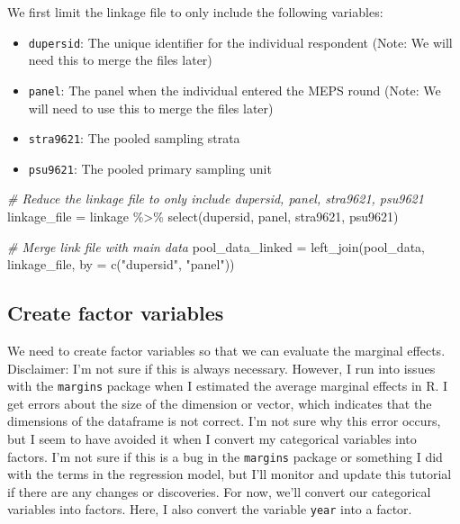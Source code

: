 \documentclass[
]{book}
\newenvironment{Shaded}{\begin{snugshade}}{\end{snugshade}}
\newcommand{\AttributeTok}[1]{\textcolor[rgb]{0.77,0.63,0.00}{#1}}
\newcommand{\CommentTok}[1]{\textcolor[rgb]{0.56,0.35,0.01}{\textit{#1}}}
\newcommand{\FunctionTok}[1]{\textcolor[rgb]{0.00,0.00,0.00}{#1}}
\newcommand{\NormalTok}[1]{#1}
\newcommand{\OtherTok}[1]{\textcolor[rgb]{0.56,0.35,0.01}{#1}}
\newcommand{\SpecialCharTok}[1]{\textcolor[rgb]{0.00,0.00,0.00}{#1}}
\newcommand{\StringTok}[1]{\textcolor[rgb]{0.31,0.60,0.02}{#1}}
\begin{document}
We first limit the linkage file to only include the following variables:

\begin{itemize}
\item
  \texttt{dupersid}: The unique identifier for the individual respondent (Note: We will need this to merge the files later)
\item
  \texttt{panel}: The panel when the individual entered the MEPS round (Note: We will need to use this to merge the files later)
\item
  \texttt{stra9621}: The pooled sampling strata
\item
  \texttt{psu9621}: The pooled primary sampling unit
\end{itemize}

\begin{Shaded}
\begin{Highlighting}[]
\CommentTok{\# Reduce the linkage file to only include dupersid, panel, stra9621, psu9621}
\NormalTok{linkage\_file }\OtherTok{=}\NormalTok{ linkage }\SpecialCharTok{\%\textgreater{}\%}
  \FunctionTok{select}\NormalTok{(dupersid, panel, stra9621, psu9621)}

\CommentTok{\# Merge link file with main data}
\NormalTok{pool\_data\_linked }\OtherTok{=} \FunctionTok{left\_join}\NormalTok{(pool\_data,}
\NormalTok{                             linkage\_file, }
                             \AttributeTok{by =} \FunctionTok{c}\NormalTok{(}\StringTok{"dupersid"}\NormalTok{, }\StringTok{"panel"}\NormalTok{))}
\end{Highlighting}
\end{Shaded}

\hypertarget{create-factor-variables}{%
\subsection{Create factor variables}\label{create-factor-variables}}

We need to create factor variables so that we can evaluate the marginal effects. Disclaimer: I'm not sure if this is always necessary. However, I run into issues with the \texttt{margins} package when I estimated the average marginal effects in R. I get errors about the size of the dimension or vector, which indicates that the dimensions of the dataframe is not correct. I'm not sure why this error occurs, but I seem to have avoided it when I convert my categorical variables into factors. I'm not sure if this is a bug in the \texttt{margins} package or something I did with the terms in the regression model, but I'll monitor and update this tutorial if there are any changes or discoveries. For now, we'll convert our categorical variables into factors. Here, I also convert the variable \texttt{year} into a factor.
\end{document}

